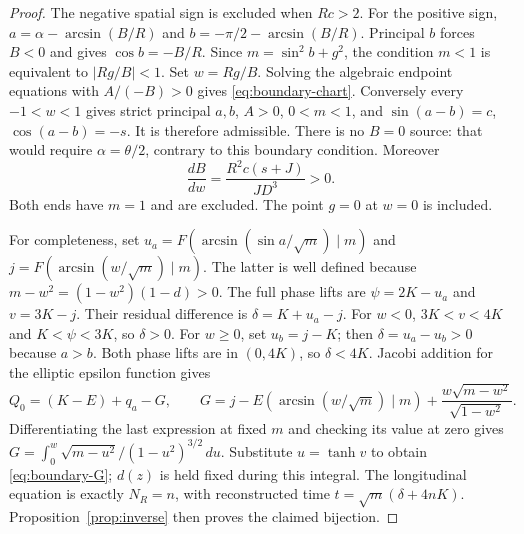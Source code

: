 \documentclass[11pt,a4paper]{article}
\theoremstyle{remark}\newtheorem{remark}[theorem]{Remark}
\begin{document}
\begin{proof}
The negative spatial sign is excluded when $Rc>2$.
For the positive sign, $a=\alpha-\arcsin(B/R)$ and
$b=-\pi/2-\arcsin(B/R)$. Principal $b$ forces $B<0$ and gives
$\cos b=-B/R$. Since $m=\sin^2b+g^2$, the condition $m<1$ is
equivalent to $|Rg/B|<1$. Set $w=Rg/B$.
Solving the algebraic endpoint equations with $A/(-B)>0$ gives
\eqref{eq:boundary-chart}. Conversely every $-1<w<1$ gives strict
principal $a,b$, $A>0$, $0<m<1$, and
$\sin(a-b)=c$, $\cos(a-b)=-s$. It is therefore admissible.
There is no $B=0$ source: that would require
$\alpha=\theta/2$, contrary to this boundary condition.
Moreover
\[
 \frac{dB}{dw}=\frac{R^2c(s+J)}{JD^3}>0.
\]
Both ends have $m=1$ and are excluded. The point $g=0$ at $w=0$
is included.

For completeness, set
$u_a=F(\arcsin(\sin a/\sqrt m)\mid m)$ and
$j=F(\arcsin(w/\sqrt m)\mid m)$.
The latter is well defined because
$m-w^2=(1-w^2)(1-d)>0$.
The full phase lifts are $\psi=2K-u_a$ and $v=3K-j$.
Their residual difference is $\delta=K+u_a-j$.
For $w<0$, $3K<v<4K$ and $K<\psi<3K$, so $\delta>0$.
For $w\ge0$, set $u_b=j-K$; then $\delta=u_a-u_b>0$ because
$a>b$. Both phase lifts are in $(0,4K)$, so $\delta<4K$.
Jacobi addition for the elliptic epsilon function gives
\[
 Q_0=(K-E)+q_a-G,\qquad
 G=j-E(\arcsin(w/\sqrt m)\mid m)
           +\frac{w\sqrt{m-w^2}}{\sqrt{1-w^2}}.
\]
Differentiating the last expression at fixed $m$ and checking its
value at zero gives
$G=\int_0^w\sqrt{m-u^2}/(1-u^2)^{3/2}\,du$.
Substitute $u=\tanh v$ to obtain \eqref{eq:boundary-G};
$d(z)$ is held fixed during this integral.
The longitudinal equation is exactly $N_R=n$, with reconstructed
time $t=\sqrt m(\delta+4nK)$. Proposition~\ref{prop:inverse}
then proves the claimed bijection.
\end{proof}
\end{document}
